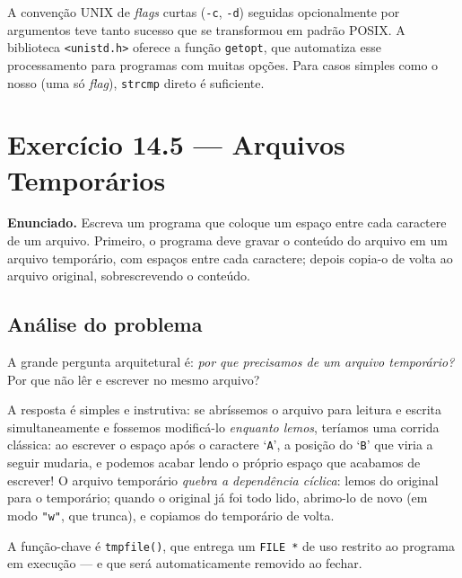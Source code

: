 \documentclass[11pt,a4paper]{article}
\begin{document}
\begin{obseng}
A conven\c{c}\~ao UNIX de \emph{flags} curtas (\texttt{-c}, \texttt{-d}) seguidas opcionalmente por argumentos teve tanto sucesso que se transformou em padr\~ao POSIX. A biblioteca \texttt{<unistd.h>} oferece a fun\c{c}\~ao \texttt{getopt}, que automatiza esse processamento para programas com muitas op\c{c}\~oes. Para casos simples como o nosso (uma s\'o \emph{flag}), \texttt{strcmp} direto \'e suficiente.
\end{obseng}

\section{Exerc\'icio 14.5 --- Arquivos Tempor\'arios}

\begin{enunciado}
\textbf{Enunciado.} Escreva um programa que coloque um espa\c{c}o entre cada caractere de um arquivo. Primeiro, o programa deve gravar o conte\'udo do arquivo em um arquivo tempor\'ario, com espa\c{c}os entre cada caractere; depois copia-o de volta ao arquivo original, sobrescrevendo o conte\'udo.
\end{enunciado}

\subsection*{An\'alise do problema}

A grande pergunta arquitetural \'e: \emph{por que precisamos de um arquivo tempor\'ario?} Por que n\~ao l\^er e escrever no mesmo arquivo?

A resposta \'e simples e instrutiva: se abr\'issemos o arquivo para leitura e escrita simultaneamente e fossemos modific\'a-lo \emph{enquanto lemos}, ter\'iamos uma corrida cl\'assica: ao escrever o espa\c{c}o ap\'os o caractere `\texttt{A}', a posi\c{c}\~ao do `\texttt{B}' que viria a seguir mudaria, e podemos acabar lendo o pr\'oprio espa\c{c}o que acabamos de escrever! O arquivo tempor\'ario \emph{quebra a depend\^encia c\'iclica}: lemos do original para o tempor\'ario; quando o original j\'a foi todo lido, abrimo-lo de novo (em modo \texttt{"w"}, que trunca), e copiamos do tempor\'ario de volta.

A fun\c{c}\~ao-chave \'e \texttt{tmpfile()}, que entrega um \texttt{FILE *} de uso restrito ao programa em execu\c{c}\~ao --- e que ser\'a automaticamente removido ao fechar.
\end{document}
